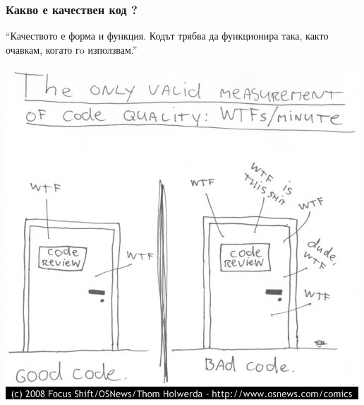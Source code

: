 
\begin{frame}
  \frametitle{Какво е качествен код ?}

\begin{exampleblock}{}
  {\large ``Качеството е форма и функция.  Кодът трябва да функционира така, както очавкам, когато гo използвам.''}
\end{exampleblock}
\end{frame}

\begin{frame}
   \begin{center}
   \includegraphics[width=\textwidth,height=0.8\textheight,keepaspectratio]{wtfm.jpg}
   \end{center}
\end{frame}





